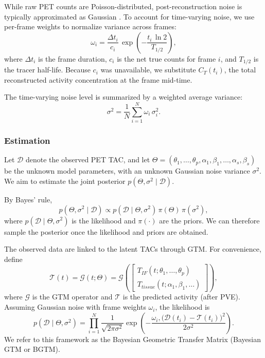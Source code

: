 While raw PET counts are Poisson-distributed, post-reconstruction noise is typically approximated as Gaussian \cite{TODO}.
To account for time-varying noise, we use per-frame weights to normalize variance across frames:
\begin{equation}
	\omega_{i} = \frac{\Delta t_i}{c_i}\,\exp\!\left(-\frac{t_{i}\,\ln 2}{T_{1/2}}\right),
\end{equation}
where \(\Delta t_i\) is the frame duration, \(c_i\) is the net true counts for frame \(i\), and \(T_{1/2}\) is the tracer half-life.
Because \(c_i\) was unavailable, we substitute \(C_T(t_i)\), the total reconstructed activity concentration at the frame mid-time.

The time-varying noise level is summarized by a weighted average variance:
\begin{equation}
	\sigma^2 = \frac{1}{N} \sum_{i=1}^{N} \omega_i\,\sigma_i^2.
\end{equation}

\subsubsection{Estimation}
Let \(\mathcal{D}\) denote the observed PET TAC, and let \( \Theta = (\theta_{1}, \dots,\theta_{p}, \alpha_{1}, \beta_{1}, \dots, \alpha_{s}, \beta_{s}) \) be the unknown model parameters, with an unknown Gaussian noise variance \(\sigma^2\).
We aim to estimate the joint posterior \(p(\Theta,\sigma^2\mid \mathcal{D})\).

By Bayes’ rule,
\begin{equation}\label{eq:posterior}
	p(\Theta,\sigma^2 \mid \mathcal{D}) \propto p(\mathcal{D} \mid \Theta,\sigma^2)\,\pi( \Theta )\,\pi( \sigma^2),
\end{equation}
where \(p(\mathcal{D} \mid \Theta,\sigma^2)\) is the likelihood and \(\pi(\cdot)\) are the priors.
We can therefore sample the posterior once the likelihood and priors are obtained.

The observed data are linked to the latent TACs through GTM.
For convenience, define
\begin{equation}
	\mathcal{T}(t) = \mathcal{G}(t;\Theta) =
	\mathcal{G}\!\left(
	\begin{bmatrix}
			T_{IF}(t;\theta_{1}, \dots, \theta_{p}) \\
			T_{tissue}(t;\alpha_{1}, \beta_{1}, \dots)
		\end{bmatrix}\right),
\end{equation}
where \(\mathcal{G}\) is the GTM operator and \(\mathcal{T}\) is the predicted activity (after PVE).
Assuming Gaussian noise with frame weights \(\omega_i\), the likelihood is
\begin{equation}
	p(\mathcal{D} \mid \Theta,\sigma^2) = \prod_{i=1}^N \frac{1}{\sqrt{2\pi \sigma^2}} \exp\!\left( -\frac{\omega_i,\bigl(\mathcal{D}(t_i) - \mathcal{T}(t_i)\bigr)^2}{2\sigma^2} \right).
\end{equation}
We refer to this framework as the Bayesian Geometric Transfer Matrix (Bayesian GTM or BGTM).

